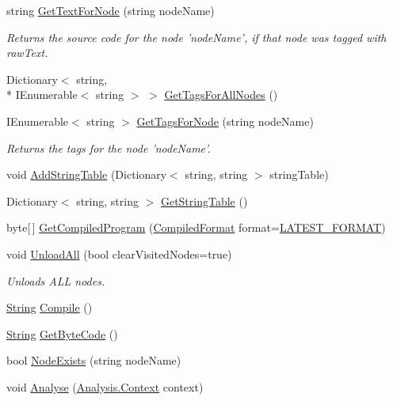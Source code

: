 \begin{DoxyCompactItemize}
\item 
string \hyperlink{a00092_a594641914a2b59cc5231645273d18e82}{Get\-Text\-For\-Node} (string node\-Name)
\begin{DoxyCompactList}\small\item\em Returns the source code for the node 'node\-Name', if that node was tagged with raw\-Text. \end{DoxyCompactList}\item 
Dictionary$<$ string, \\*
I\-Enumerable$<$ string $>$ $>$ \hyperlink{a00092_a20ef38a17e4a346de3b572b85052c1d1}{Get\-Tags\-For\-All\-Nodes} ()
\item 
I\-Enumerable$<$ string $>$ \hyperlink{a00092_ab85166316a6c5aadce336316406ed164}{Get\-Tags\-For\-Node} (string node\-Name)
\begin{DoxyCompactList}\small\item\em Returns the tags for the node 'node\-Name'. \end{DoxyCompactList}\item 
void \hyperlink{a00092_acfb8561e08dc85c6d9a855ad07d18783}{Add\-String\-Table} (Dictionary$<$ string, string $>$ string\-Table)
\item 
Dictionary$<$ string, string $>$ \hyperlink{a00092_af5fe57ebd11c41208070972f06a31b9d}{Get\-String\-Table} ()
\item 
byte\mbox{[}$\,$\mbox{]} \hyperlink{a00092_a5b664d4bbe7c47c246fe0beca9648687}{Get\-Compiled\-Program} (\hyperlink{a00092_a903f18cdcc66c28ceab5a43c41fe074d}{Compiled\-Format} format=\hyperlink{a00092_a3bc83587462ade6a2f7f42cb7576e50e}{L\-A\-T\-E\-S\-T\-\_\-\-F\-O\-R\-M\-A\-T})
\item 
void \hyperlink{a00092_a7acfe32f91b36ee812059f2ad3011133}{Unload\-All} (bool clear\-Visited\-Nodes=true)
\begin{DoxyCompactList}\small\item\em Unloads A\-L\-L nodes. \end{DoxyCompactList}\item 
\hyperlink{a00051_a301aa7c866593a5b625a8fc158bbeacea27118326006d3829667a400ad23d5d98}{String} \hyperlink{a00092_a7a8a3a461011172f5624da3a8ffa875f}{Compile} ()
\item 
\hyperlink{a00051_a301aa7c866593a5b625a8fc158bbeacea27118326006d3829667a400ad23d5d98}{String} \hyperlink{a00092_aade6c069db8f01572060d25a963d2a14}{Get\-Byte\-Code} ()
\item 
bool \hyperlink{a00092_a93bb76a1f9a4058f225ff4cee97483c6}{Node\-Exists} (string node\-Name)
\item 
void \hyperlink{a00092_a6b67b239f50c062160666e54592c433f}{Analyse} (\hyperlink{a00057}{Analysis.\-Context} context)
\end{DoxyCompactItemize}
